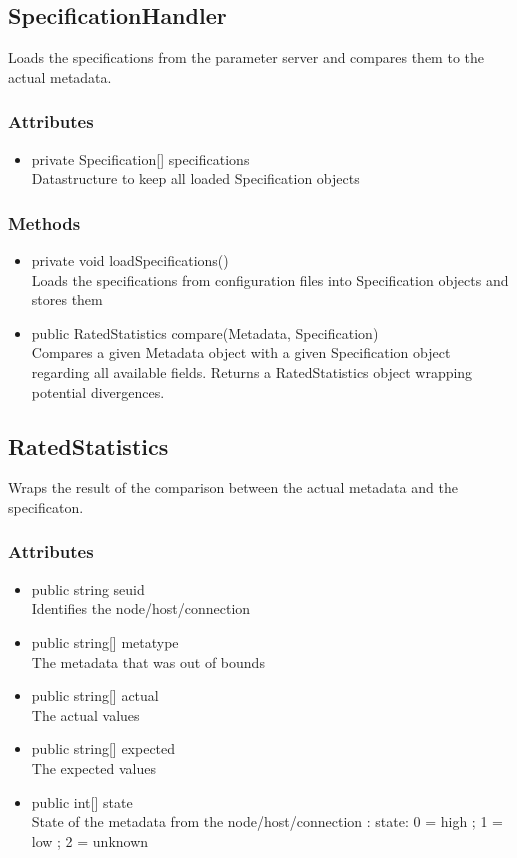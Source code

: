 \subsection{SpecificationHandler}
Loads the specifications from the parameter server and compares them to the actual metadata.

\subsubsection{Attributes}
\begin{itemize}
	\item private  Specification[] specifications\\
	Datastructure to keep all loaded Specification objects
\end{itemize}
\subsubsection{Methods}
\begin{itemize}
	\item private  void loadSpecifications()\\
	Loads the specifications from configuration files into Specification objects and stores them
	\item public  RatedStatistics compare(Metadata, Specification)\\
	Compares a given Metadata object with a given Specification object regarding all available fields. Returns a RatedStatistics object wrapping potential divergences.
\end{itemize}


\subsection{RatedStatistics}
Wraps the result of the comparison between the actual metadata and the specificaton.

\subsubsection{Attributes}
\begin{itemize}
	\item public  string seuid\\
	Identifies the node/host/connection
	\item public  string[] metatype\\
	The metadata that was out of bounds
	\item public  string[] actual\\
	The actual values
	\item public  string[] expected\\
	The expected values
	\item public  int[] state\\
	State of the metadata from the node/host/connection : state: { 0 = high ; 1 = low ; 2 = unknown}
\end{itemize}



